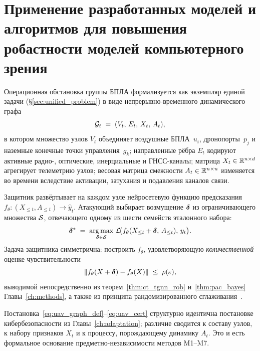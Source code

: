 \section{Применение разработанных моделей и алгоритмов для повышения робастности моделей компьютерного зрения}
\label{sec:uav_graph}

Операционная обстановка группы БПЛА формализуется как экземпляр
единой задачи (\S\ref{sec:unified_problem})
в виде непрерывно-временного динамического графа
\begin{equation}
\mathcal{G}_t \;=\; (V_t,\,E_t,\,X_t,\,A_t),
\label{eq:uav_graph_def}
\end{equation}
в котором множество узлов $V_t$ объединяет воздушные БПЛА~$u_i$,
дронопорты~$p_j$ и наземные конечные точки управления~$g_k$; направленные
рёбра $E_t$ кодируют активные радио-, оптические, инерциальные и
ГНСС-каналы; матрица $X_t \in \mathbb{R}^{n\times d}$ агрегирует телеметрию узлов;
весовая матрица смежности $A_t \in \mathbb{R}^{n\times n}$ изменяется во времени
вследствие активации, затухания и подавления каналов связи.

Защитник развёртывает на каждом узле нейросетевую функцию предсказания
$f_{\theta}\colon (X_{\le t},A_{\le t}) \to \hat{y}_t$. Атакующий выбирает
возмущение $\boldsymbol{\delta}$ из ограничивающего множества $\mathcal{S}$, отвечающего
одному из шести семейств эталонного набора:
\begin{equation}
\boldsymbol{\delta}^{*} \;=\; \mathop{\mathrm{arg\,max}}_{\boldsymbol{\delta}\in\mathcal{S}}\,
\mathcal{L}\!\bigl(f_{\theta}(X_{\le t}+\boldsymbol{\delta},\,A_{\le t}),\,y_t\bigr).
\label{eq:uav_adv_max}
\end{equation}
Задача защитника симметрична: построить $f_{\theta}$, удовлетворяющую
\emph{количественной} оценке чувствительности
\begin{equation}
\left\lVert f_{\theta}(X+\boldsymbol{\delta}) - f_{\theta}(X)\right\rVert \;\le\; \rho(\varepsilon),
\label{eq:uav_cert}
\end{equation}
выводимой непосредственно из теорем~\ref{thm:ct_tgnn_rob} и~\ref{thm:pac_bayes} Главы~\ref{ch:methods}, а также из принципа рандомизированного сглаживания~\cite{Cohen2019}.

Постановка~\eqref{eq:uav_graph_def}--\eqref{eq:uav_cert} структурно
идентична постановке кибербезопасности из Главы~\ref{ch:adaptation}; различие
сводится к составу узлов, к набору признаков $X_t$ и к процессу,
порождающему динамику $A_t$. Это и есть формальное основание
предметно-независимости методов \textsf{M1}--\textsf{M7}.

